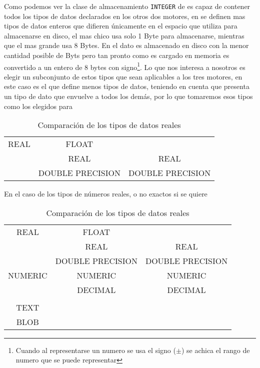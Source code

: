 Como podemos ver la clase de almacenamiento \verb=INTEGER= de \s es capaz de contener todos los tipos de datos declarados en los otros dos motores, en \m se definen mas tipos de datos enteros que  difieren únicamente en el espacio que utiliza para almacenarse en disco, el mas chico usa  solo 1 Byte para almacenarse, mientras que el mas grande usa 8 Bytes. En \s el dato es almacenado en disco con la menor cantidad posible de Byts pero tan pronto como es cargado en memoria es convertido a un entero de 8 bytes con signo\footnote{Cuando al representarse un numero se usa el signo ($\pm$) se achica el rango de numero que se puede representar}. Lo que nos  interesa a nosotros es elegir un subconjunto de estos tipos que sean aplicables a los tres motores, en este caso es \p el que define menos tipos de datos, teniendo en cuenta que \s presenta un tipo de dato que envuelve a todos los demás, por lo que tomaremos esos tipos como los elegidos para \jj

\begin{table}[h]
\begin{center}
\begin{tabular}{|c|c|c|}
\hline \s   & \m               & \p \\  
\hline REAL & FLOAT            &  \\ 
            & REAL             & REAL \\
            & DOUBLE PRECISION & DOUBLE PRECISION \\
\hline 
\end{tabular} 
\end{center}
\caption{Comparación de los tipos de datos reales}
\end{table}

En el caso de los tipos de números reales, o no exactos si se quiere

\begin{table}[h]
\begin{center}
\begin{tabular}{|c|c|c|}
\hline \s & \m & \p \\  
\hline REAL & FLOAT &  \\ 
  & REAL & REAL \\
  & DOUBLE PRECISION & DOUBLE PRECISION \\
\hline NUMERIC & NUMERIC & NUMERIC \\
  & DECIMAL & DECIMAL \\
\hline  &  &  \\  
 TEXT &  &  \\ 
 BLOB &  &  \\ 
\hline 
\end{tabular} 
\end{center}
\caption{Comparación de los tipos de datos reales}
\end{table}




